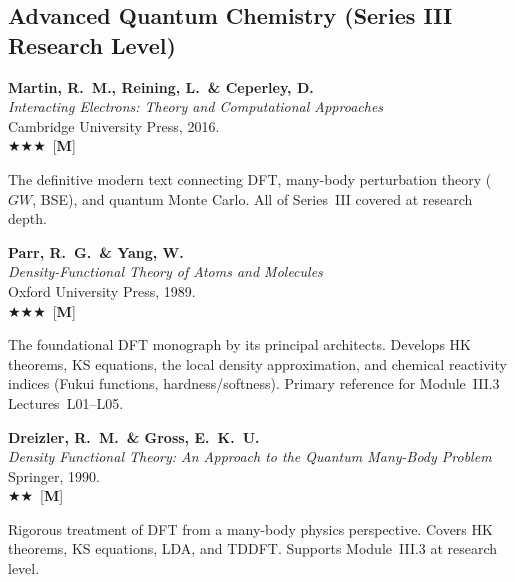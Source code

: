 \documentclass[11pt,a4paper]{article}
\newcommand{\essential}{$\bigstar\bigstar\bigstar$}
\newcommand{\recommended}{$\bigstar\bigstar$}
\newenvironment{bibentry}[1]{\begin{tcolorbox}[entrybox=#1,top=4pt,bottom=4pt]}{\end{tcolorbox}\smallskip}
\begin{document}
\subsection{Advanced Quantum Chemistry (Series III Research Level)}

\begin{bibentry}{t5light}
\textbf{Martin, R.~M., Reining, L.\ \& Ceperley, D.}\\
\textit{Interacting Electrons: Theory and Computational Approaches}\\
Cambridge University Press, 2016.\\[3pt]
\essential\ [\textbf{M}]\\[3pt]
\begin{tcolorbox}[annotbox]
The definitive modern text connecting DFT, many-body perturbation theory ($GW$, BSE),
and quantum Monte Carlo. All of Series~III covered at research depth.
\end{tcolorbox}
\end{bibentry}

\begin{bibentry}{t5light}
\textbf{Parr, R.~G.\ \& Yang, W.}\\
\textit{Density-Functional Theory of Atoms and Molecules}\\
Oxford University Press, 1989.\\[3pt]
\essential\ [\textbf{M}]\\[3pt]
\begin{tcolorbox}[annotbox]
The foundational DFT monograph by its principal architects. Develops HK theorems,
KS equations, the local density approximation, and chemical reactivity indices
(Fukui functions, hardness/softness). Primary reference for Module~III.3 Lectures~L01--L05.
\end{tcolorbox}
\end{bibentry}

\begin{bibentry}{t5light}
\textbf{Dreizler, R.~M.\ \& Gross, E.~K.~U.}\\
\textit{Density Functional Theory: An Approach to the Quantum Many-Body Problem}\\
Springer, 1990.\\[3pt]
\recommended\ [\textbf{M}]\\[3pt]
\begin{tcolorbox}[annotbox]
Rigorous treatment of DFT from a many-body physics perspective. Covers HK theorems,
KS equations, LDA, and TDDFT. Supports Module~III.3 at research level.
\end{tcolorbox}
\end{bibentry}
\end{document}

